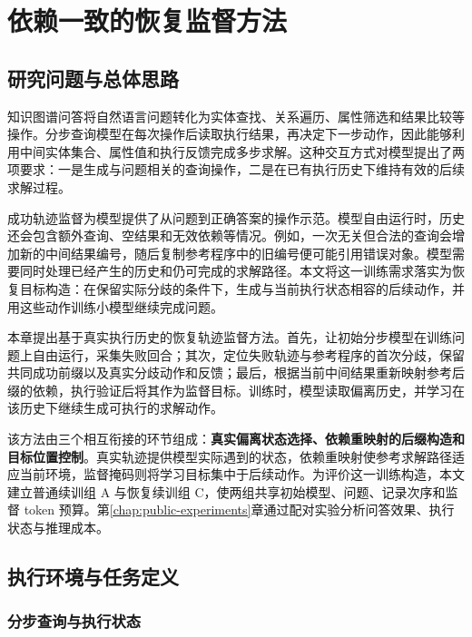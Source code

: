 \chapter{依赖一致的恢复监督方法}
\label{chap:execution-feedback}

\section{研究问题与总体思路}

知识图谱问答将自然语言问题转化为实体查找、关系遍历、属性筛选和结果比较等操作。分步查询模型在每次操作后读取执行结果，再决定下一步动作，因此能够利用中间实体集合、属性值和执行反馈完成多步求解。这种交互方式对模型提出了两项要求：一是生成与问题相关的查询操作，二是在已有执行历史下维持有效的后续求解过程。

成功轨迹监督为模型提供了从问题到正确答案的操作示范。模型自由运行时，历史还会包含额外查询、空结果和无效依赖等情况。例如，一次无关但合法的查询会增加新的中间结果编号，随后复制参考程序中的旧编号便可能引用错误对象。模型需要同时处理已经产生的历史和仍可完成的求解路径。本文将这一训练需求落实为恢复目标构造：在保留实际分歧的条件下，生成与当前执行状态相容的后续动作，并用这些动作训练小模型继续完成问题。

本章提出基于真实执行历史的恢复轨迹监督方法。首先，让初始分步模型在训练问题上自由运行，采集失败回合；其次，定位失败轨迹与参考程序的首次分歧，保留共同成功前缀以及真实分歧动作和反馈；最后，根据当前中间结果重新映射参考后缀的依赖，执行验证后将其作为监督目标。训练时，模型读取偏离历史，并学习在该历史下继续生成可执行的求解动作。

该方法由三个相互衔接的环节组成：\textbf{真实偏离状态选择、依赖重映射的后缀构造和目标位置控制}。真实轨迹提供模型实际遇到的状态，依赖重映射使参考求解路径适应当前环境，监督掩码则将学习目标集中于后续动作。为评价这一训练构造，本文建立普通续训组 A 与恢复续训组 C，使两组共享初始模型、问题、记录次序和监督 token 预算。第\ref{chap:public-experiments}章通过配对实验分析问答效果、执行状态与推理成本。

\section{执行环境与任务定义}

\subsection{分步查询与执行状态}

